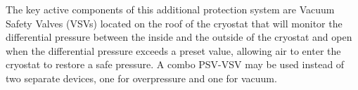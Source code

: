 The key active components of this additional protection system are Vacuum Safety Valves (VSVs) located on the roof of the cryostat that will monitor the differential pressure between the inside and the outside of the cryostat and open when the differential pressure exceeds a preset value, allowing air to enter the cryostat to restore a safe pressure. A combo PSV-VSV may be used instead of two separate devices, one for overpressure and one for vacuum.

